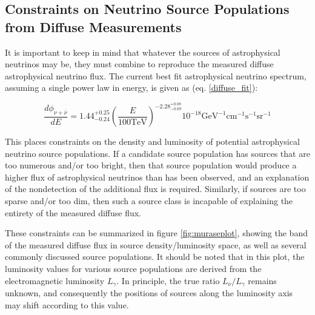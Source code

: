 \subsection{Constraints on Neutrino Source Populations from Diffuse Measurements}
It is important to keep in mind that whatever the sources of astrophysical neutrinos may be, they must combine to reproduce the measured diffuse astrophysical neutrino flux. The current best fit astrophysical neutrino spectrum, assuming a single power law in energy, is given as (eq. \ref{diffuse_fit}):

\begin{equation}
    \frac{d\phi_{\nu+\bar{\nu}}}{dE} = 1.44_{-0.24}^{+0.25} (\frac{E}{100 \textrm{TeV}})^{-2.28_{-0.09}^{+0.08}} 10^{-18} \textrm{GeV}^{-1}\textrm{cm}^{-1}\textrm{s}^{-1}\textrm{sr}^{-1}
\label{diffuse_fit}
\end{equation}

This places constraints on the density and luminosity of potential astrophysical neutrino source populations. If a candidate source population has sources that are too numerous and/or too bright, then that source population would produce a higher flux of astrophysical neutrinos than has been observed, and an explanation of the nondetection of the additional flux is required. Similarly, if sources are too sparse and/or too dim, then such a source class is incapable of explaining the entirety of the measured diffuse flux. 

These constraints can be summarized in figure \ref{fig:muraseplot}, showing the band of the measured diffuse flux in source density/luminosity space, as well as several commonly discussed source populations. It should be noted that in this plot, the luminosity values for various source populations are derived from the electromagnetic luminosity $L_\gamma$. In principle, the true ratio $L_\nu/L_\gamma$ remains unknown, and consequently the positions of sources along the luminosity axis may shift according to this value. 


